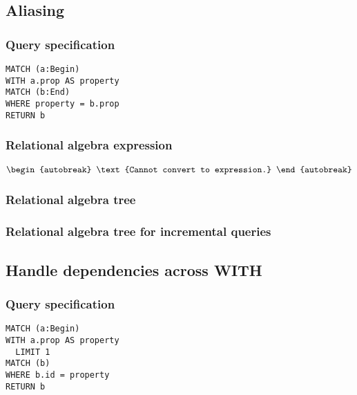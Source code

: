 \subsection{Aliasing}

\subsubsection*{Query specification}

\begin{lstlisting}
MATCH (a:Begin)
WITH a.prop AS property
MATCH (b:End)
WHERE property = b.prop
RETURN b
\end{lstlisting}

\subsubsection*{Relational algebra expression}

\begin{align*}
\begin{autobreak}
\text{Cannot convert to expression.}
\end{autobreak}
\end{align*}

\subsubsection*{Relational algebra tree}


\subsubsection*{Relational algebra tree for incremental queries}


\subsection{Handle dependencies across WITH}

\subsubsection*{Query specification}

\begin{lstlisting}
MATCH (a:Begin)
WITH a.prop AS property
  LIMIT 1
MATCH (b)
WHERE b.id = property
RETURN b
\end{lstlisting}

